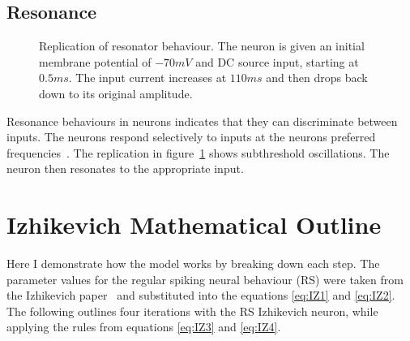 \documentclass[12pt]{scrreprt}
\begin{document}
\subsection{Resonance}
\label{subsec:RZ}
\begin{figure}[H]
\centering
{}
\caption{Replication of resonator behaviour.
The neuron is given an initial membrane potential of $-70mV$ and DC source input, starting at $0.5ms$.
The input current increases at $110ms$ and then drops back down to its original amplitude.}
\label{fig:RZ}
\end{figure} 
Resonance behaviours in neurons indicates that they can discriminate between inputs.
The neurons respond selectively to inputs at the neurons preferred frequencies~\cite{hutcheon2000resonance}.
The replication in figure~\ref{fig:RZ} shows subthreshold oscillations.
The neuron then resonates to the appropriate input. 

\section{Izhikevich Mathematical Outline}
\label{sec:iterations}
Here I demonstrate how the model works by breaking down each step. 
The parameter values for the regular spiking neural behaviour (RS) were taken from the Izhikevich paper~\cite{izhikevich2003simple} and substituted into the equations \ref{eq:IZ1} and \ref{eq:IZ2}. 
The following outlines four iterations with the RS Izhikevich neuron, while applying the rules from equations \ref{eq:IZ3} and \ref{eq:IZ4}. \\
\end{document}
